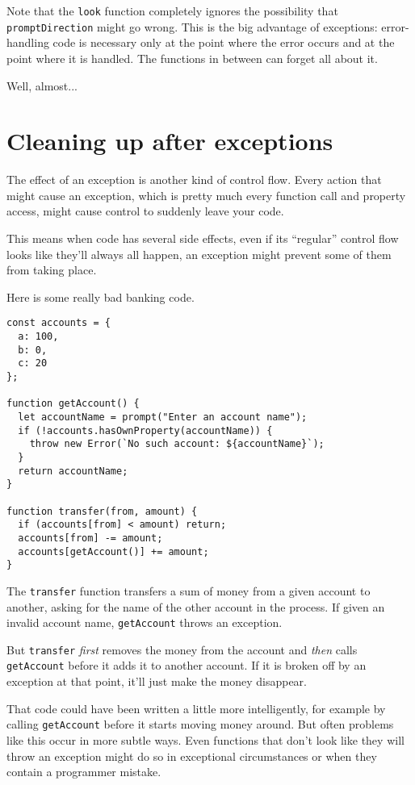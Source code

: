 Note that the \lstinline`look` function completely ignores the possibility that \lstinline`promptDirection` might go wrong. This is the big advantage of exceptions: error-handling code is necessary only at the point where the error occurs and at the point where it is handled. The functions in between can forget all about it.

Well, almost...

\section{Cleaning up after exceptions}

The effect of an exception is another kind of control flow. Every action that might cause an exception, which is pretty much every function call and property access, might cause control to suddenly leave your code.

This means when code has several side effects, even if its ``regular'' control flow looks like they'll always all happen, an exception might prevent some of them from taking place.

Here is some really bad banking code.

\begin{lstlisting}
const accounts = {
  a: 100,
  b: 0,
  c: 20
};

function getAccount() {
  let accountName = prompt("Enter an account name");
  if (!accounts.hasOwnProperty(accountName)) {
    throw new Error(`No such account: ${accountName}`);
  }
  return accountName;
}

function transfer(from, amount) {
  if (accounts[from] < amount) return;
  accounts[from] -= amount;
  accounts[getAccount()] += amount;
}
\end{lstlisting}
\noindent

The \lstinline`transfer` function transfers a sum of money from a given account to another, asking for the name of the other account in the process. If given an invalid account name, \lstinline`getAccount` throws an exception.

But \lstinline`transfer` \emph{first} removes the money from the account and \emph{then} calls \lstinline`getAccount` before it adds it to another account. If it is broken off by an exception at that point, it'll just make the money disappear.

That code could have been written a little more intelligently, for example by calling \lstinline`getAccount` before it starts moving money around. But often problems like this occur in more subtle ways. Even functions that don't look like they will throw an exception might do so in exceptional circumstances or when they contain a programmer mistake.

